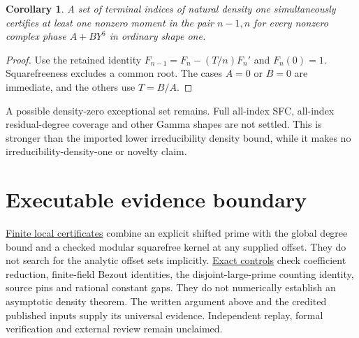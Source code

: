 \documentclass[11pt]{article}
\newtheorem{corollary}[theorem]{Corollary}
\begin{document}
\begin{corollary}
A set of terminal indices of natural density one simultaneously certifies
at least one nonzero moment in the pair $n-1,n$ for every nonzero complex
phase $A+BY^6$ in ordinary shape one.
\end{corollary}
\begin{proof}
Use the retained identity $F_{n-1}=F_n-(T/n)F_n'$ and $F_n(0)=1$.
Squarefreeness excludes a common root. The cases $A=0$ or $B=0$ are
immediate, and the others use $T=B/A$.
\end{proof}
A possible density-zero exceptional set remains. Full all-index SFC,
all-index residual-degree coverage and other Gamma shapes are not settled.
This is stronger than the imported lower irreducibility density bound,
while it makes no irreducibility-density-one or novelty claim.

\section{Executable evidence boundary}
\href{density_one_windows.py}{Finite local certificates} combine an
explicit shifted prime with the global degree bound and a checked modular
squarefree kernel at any supplied offset. They do not search for the
analytic offset sets implicitly.
\href{verify_density_one.py}{Exact controls} check coefficient reduction,
finite-field Bezout identities, the disjoint-large-prime counting identity,
source pins and rational constant gaps. They do not numerically establish
an asymptotic density theorem. The written argument above and the credited
published inputs supply its universal evidence. Independent replay,
formal verification and external review remain unclaimed.
\end{document}
